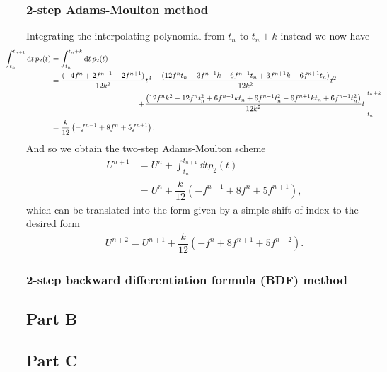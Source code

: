 \documentclass[12pt]{article}
\begin{document}
\subsubsection*{2-step Adams-Moulton method}
Integrating the interpolating polynomial from $t_{n}$ to $t_{n}+k$ instead we now have
\begin{subequations}
    \begin{align}
    \hspace{-1cm}\int_{t_{n}}^{t_{n+1}}\dd{t}p_{2}(t) &= \int_{t_{n}}^{t_{n}+k}\dd{t}p_{2}(t)\\
    &= \frac{(-4f^{n}+2f^{n-1}+2f^{n+1})}{12k^2}t^3 +\frac{(12f^{n}
        t_{n}-3f^{n-1}k-6f^{n-1}t_{n}+3f^{n+1}k-6f^{n+1}t_{n})}{12 k^2}t^2\nonumber \\ 
    &\hspace{4cm}\left.+\frac{\left(12f^{n}k^2-12f^{n}t_{n}^2+6
        f^{n-1} k t_{n}+6 f^{n-1} t_{n}^2-6f^{n+1}k t_{n}+6
        f^{n+1}t_{n}^2\right)}{12 k^2}t\right|_{t_{n}}^{t_{n}+k}\\
    &= \dfrac{k}{12}\left(-f^{n-1}+8f^{n}+5f^{n+1}\right).
    \end{align}
\end{subequations}
And so we obtain the two-step Adams-Moulton scheme
\begin{subequations}
    \begin{align}
        U^{n+1} &= U^{n} + \int_{t_{n}}^{t_{n+1}}\dd{t}p_{2}(t)\\
        &= U^{n} + \dfrac{k}{12}(-f^{n-1}+8f^{n}+5f^{n+1}),
    \end{align}
\end{subequations}
which can be translated into the form given by a simple shift of index to the desired form
\begin{align}
    U^{n+2} = U^{n+1} + \dfrac{k}{12}(-f^{n}+8f^{n+1}+5f^{n+2}).
\end{align}

\subsubsection*{2-step backward differentiation formula (BDF) method}


\subsection*{Part B}

\subsection*{Part C}
\end{document}
